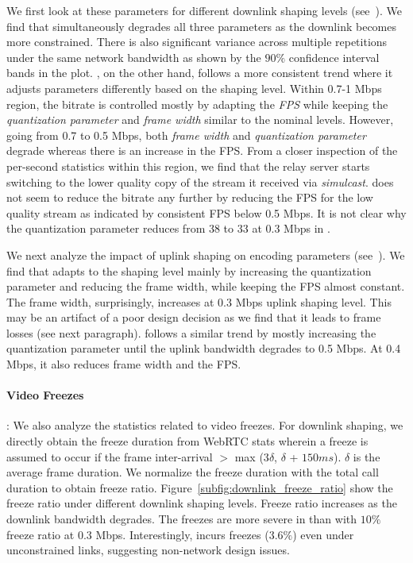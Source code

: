 We first look at these parameters for different downlink shaping levels (see~). We find that \teamsbrowser simultaneously degrades all three parameters as the downlink becomes more constrained. There is also significant variance across multiple repetitions under the same network bandwidth as shown by the $90\%$ confidence interval bands in the plot. \meet, on the other hand, follows a more consistent trend where it adjusts parameters differently based on the shaping level. Within 0.7-1 Mbps region, the bitrate is controlled mostly by adapting the \textit{FPS} while keeping the \textit{quantization parameter} and \textit{frame width} similar to the nominal levels. However, going from 0.7 to 0.5 Mbps, both \textit{frame width} and \textit{quantization parameter} degrade whereas there is an increase in the FPS. From a closer inspection of the per-second statistics within this region, we find that the relay server starts switching to the lower quality copy of the stream it received via \textit{simulcast}. \meet does not seem to reduce the bitrate any further by reducing the FPS for the low quality stream as indicated by consistent FPS below 0.5 Mbps. It is not clear why the quantization parameter reduces from 38 to 33 at 0.3 Mbps in \meet. 

We next analyze the impact of uplink shaping on encoding parameters (see~). We find that \teams adapts to the shaping level mainly by increasing the quantization parameter and reducing the frame width, while keeping the FPS almost constant. The frame width, surprisingly, increases at 0.3 Mbps uplink shaping level. This may be an artifact of a poor design decision as we find that it leads to frame losses (see next paragraph). \meet follows a similar trend by mostly increasing the quantization parameter until the uplink bandwidth degrades to 0.5 Mbps. At 0.4 Mbps, it also reduces frame width and the FPS. 

\paragraph{Video Freezes}: We also analyze the statistics related to video freezes. For downlink shaping, we directly obtain the freeze duration from WebRTC stats wherein a freeze is assumed to occur if the frame inter-arrival $>$ max (3$\delta$, $\delta$ + $150 ms$). $\delta$ is the average frame duration. We normalize the freeze duration with the total call duration to obtain freeze ratio.  Figure~\ref{subfig:downlink_freeze_ratio} show the freeze ratio under different downlink shaping levels. Freeze ratio increases as the downlink bandwidth degrades. The freezes are more severe in \meet than \teamsbrowser with $10\%$ freeze ratio at 0.3 Mbps. Interestingly, \teamsbrowser incurs freezes ($3.6\%$) even under unconstrained links, suggesting non-network design issues. 

